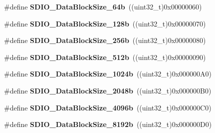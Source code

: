 \begin{DoxyCompactItemize}
\item 
\hypertarget{group___s_d_i_o___data___block___size_ga981c219228ae8df11a501e15843338d4}{}\#define {\bfseries S\+D\+I\+O\+\_\+\+Data\+Block\+Size\+\_\+64b}~((uint32\+\_\+t)0x00000060)\label{group___s_d_i_o___data___block___size_ga981c219228ae8df11a501e15843338d4}

\item 
\hypertarget{group___s_d_i_o___data___block___size_gaba545c3a5e0f3296341d89a647cb9751}{}\#define {\bfseries S\+D\+I\+O\+\_\+\+Data\+Block\+Size\+\_\+128b}~((uint32\+\_\+t)0x00000070)\label{group___s_d_i_o___data___block___size_gaba545c3a5e0f3296341d89a647cb9751}

\item 
\hypertarget{group___s_d_i_o___data___block___size_gaa099d7706f98a4fa6eb88277dc6680cf}{}\#define {\bfseries S\+D\+I\+O\+\_\+\+Data\+Block\+Size\+\_\+256b}~((uint32\+\_\+t)0x00000080)\label{group___s_d_i_o___data___block___size_gaa099d7706f98a4fa6eb88277dc6680cf}

\item 
\hypertarget{group___s_d_i_o___data___block___size_gaa619848f7700962c5b7065f43e286e0b}{}\#define {\bfseries S\+D\+I\+O\+\_\+\+Data\+Block\+Size\+\_\+512b}~((uint32\+\_\+t)0x00000090)\label{group___s_d_i_o___data___block___size_gaa619848f7700962c5b7065f43e286e0b}

\item 
\hypertarget{group___s_d_i_o___data___block___size_ga7dad3c1c33e63a00eb6301b0a1135baf}{}\#define {\bfseries S\+D\+I\+O\+\_\+\+Data\+Block\+Size\+\_\+1024b}~((uint32\+\_\+t)0x000000\+A0)\label{group___s_d_i_o___data___block___size_ga7dad3c1c33e63a00eb6301b0a1135baf}

\item 
\hypertarget{group___s_d_i_o___data___block___size_ga41eb937621c7ffcf2688c6bc0ea31464}{}\#define {\bfseries S\+D\+I\+O\+\_\+\+Data\+Block\+Size\+\_\+2048b}~((uint32\+\_\+t)0x000000\+B0)\label{group___s_d_i_o___data___block___size_ga41eb937621c7ffcf2688c6bc0ea31464}

\item 
\hypertarget{group___s_d_i_o___data___block___size_ga360411488abdbaf9eee9b99fca793f79}{}\#define {\bfseries S\+D\+I\+O\+\_\+\+Data\+Block\+Size\+\_\+4096b}~((uint32\+\_\+t)0x000000\+C0)\label{group___s_d_i_o___data___block___size_ga360411488abdbaf9eee9b99fca793f79}

\item 
\hypertarget{group___s_d_i_o___data___block___size_gaf61913f3eff52c0f728db9ffbdaca7d2}{}\#define {\bfseries S\+D\+I\+O\+\_\+\+Data\+Block\+Size\+\_\+8192b}~((uint32\+\_\+t)0x000000\+D0)\label{group___s_d_i_o___data___block___size_gaf61913f3eff52c0f728db9ffbdaca7d2}


\end{DoxyCompactItemize}
